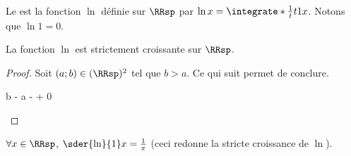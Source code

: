\begin{defi}
    Le  est la fonction $\ln$ définie sur $\RRsp$ par $\ln x = \integrate*{\frac1t}{t}{1}{x}$.
    Notons que $\ln 1 = 0$.
\end{defi}




\begin{fact} \label{ln-mono}
    La fonction $\ln$ est strictement croissante sur $\RRsp$.
\end{fact}


\begin{proof}
    Soit $(a;b) \in ( \RRsp )^2$ tel que $b > a$. Ce qui suit permet de conclure.

    \begin{stepcalc}[style=sar]
        \ln b - \ln a
    \explnext{}
         - 
         + 
        0
    \end{stepcalc}

    \null
    \vspace{-4ex}
\end{proof}




\begin{fact} \label{ln-der}
    $\forall x \in \RRsp$,
    $\sder{\ln}{1} x = \frac1x$
    (ceci redonne la stricte croissance de $\ln$).
\end{fact}


